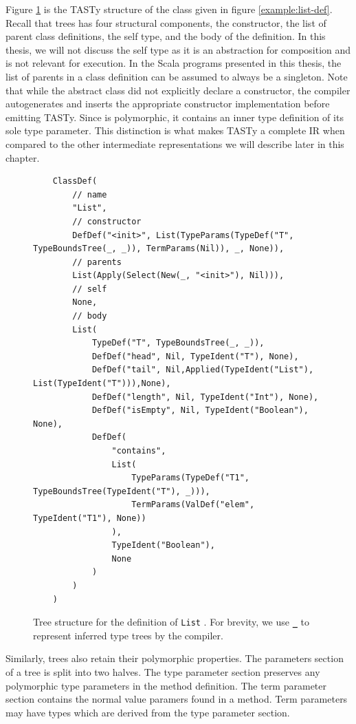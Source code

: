 Figure \ref{tasty:list} is the TASTy structure of the  class given in figure \ref{example:list-def}. 
Recall that  trees has four structural components, the constructor, the list of parent class definitions, the self type, and the body of the definition.
In this thesis, we will not discuss the self type as it is an abstraction for composition\cite{gilad:mixins}\cite{scala:calculus} and is not relevant for execution.
In the Scala programs presented in this thesis, the list of parents in a class definition can be assumed to always be a singleton.
Note that while the abstract  class did not explicitly declare a constructor, the compiler autogenerates and inserts the appropriate constructor implementation before emitting TASTy.
Since  is polymorphic, it contains an inner type definition of its sole type parameter.
This distinction is what makes TASTy a complete IR when compared to the other intermediate representations we will describe later in this chapter.

\begin{figure}[!htb]
	\begin{verbatim}
	ClassDef(
		// name 
		"List",
		// constructor
		DefDef("<init>", List(TypeParams(TypeDef("T", TypeBoundsTree(_, _)), TermParams(Nil)), _, None)),
		// parents
		List(Apply(Select(New(_, "<init>"), Nil))),
		// self
		None,
		// body
		List(
			TypeDef("T", TypeBoundsTree(_, _)),
			DefDef("head", Nil, TypeIdent("T"), None),
			DefDef("tail", Nil,Applied(TypeIdent("List"), List(TypeIdent("T"))),None),
			DefDef("length", Nil, TypeIdent("Int"), None),
			DefDef("isEmpty", Nil, TypeIdent("Boolean"), None),
			DefDef(
				"contains",
				List(
					TypeParams(TypeDef("T1", TypeBoundsTree(TypeIdent("T"), _))),
					TermParams(ValDef("elem", TypeIdent("T1"), None))
				),
				TypeIdent("Boolean"),
				None
			)
		)
	)
	\end{verbatim} 
	\caption{Tree structure for the definition of \texttt{List} . For brevity, we use \textbf{\texttt{\_}} to represent inferred\cite{ml:type-inference} type trees by the compiler.}
	\label{tasty:list}
\end{figure}

Similarly,  trees also retain their polymorphic properties.
The parameters section of a  tree is split into two halves.
The type parameter section preserves any polymorphic type parameters in the method definition.
The term parameter section contains the normal value paramers found in a method.
Term parameters may have types which are derived from the type parameter section.

